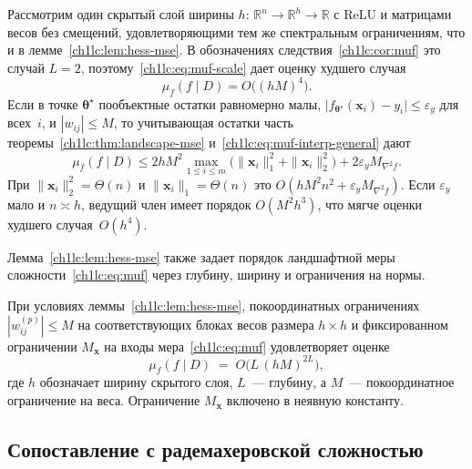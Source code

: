\begin{corollary}\label{ch1lc:cor:shallow}
Рассмотрим один скрытый слой ширины $h$: $\mathbb{R}^{n}\to\mathbb{R}^{h}\to\mathbb{R}$ с ReLU и матрицами весов без смещений, удовлетворяющими тем же спектральным ограничениям, что и в лемме~\ref{ch1lc:lem:hess-mse}.
В обозначениях следствия~\ref{ch1lc:cor:muf} это случай $L=2$, поэтому~\eqref{ch1lc:eq:muf-scale} дает оценку худшего случая
\begin{equation}\label{ch1lc:eq:muf-shallow-worst}
  \mu_f(f\mid D)=O\!\bigl((hM)^{4}\bigr).
\end{equation}
Если в точке $\boldsymbol{\theta}^\star$ пообъектные остатки равномерно малы,
$\bigl|f_{\boldsymbol{\theta}^\star}(\mathbf{x}_i)-y_i\bigr|\le\varepsilon_y$ для всех~$i$, и $|w_{ij}|\le M$, то учитывающая остатки часть теоремы~\ref{ch1lc:thm:landscape-mse} и~\eqref{ch1lc:eq:muf-interp-general} дают
\[
  \mu_f(f\mid D)
  \le
  2hM^{2}\max_{1\le i\le m}\bigl(\|\mathbf{x}_i\|_{1}^{2}+\|\mathbf{x}_i\|_{2}^{2}\bigr)
  +
  2\varepsilon_y M_{\nabla^2 f}.
\]
При $\|\mathbf{x}_i\|_{2}^{2}=\Theta(n)$ и $\|\mathbf{x}_i\|_{1}=\Theta(n)$ это $O(hM^{2}n^{2}+\varepsilon_y M_{\nabla^2 f})$. Если $\varepsilon_y$ мало и $n\asymp h$, ведущий член имеет порядок $O(M^{2}h^{3})$, что мягче оценки худшего случая~$O(h^{4})$.
\end{corollary}

\noindent
Лемма~\ref{ch1lc:lem:hess-mse} также задает порядок ландшафтной меры сложности~\eqref{ch1lc:eq:muf} через глубину, ширину и ограничения на нормы.

\begin{corollary}\label{ch1lc:cor:muf}
При условиях леммы~\ref{ch1lc:lem:hess-mse}, покоординатных ограничениях $|w_{ij}^{(p)}|\le M$ на соответствующих блоках весов размера $h\times h$ и фиксированном ограничении $M_{\mathbf{x}}$ на входы мера~\eqref{ch1lc:eq:muf} удовлетворяет оценке
\begin{equation}\label{ch1lc:eq:muf-scale}
  \mu_f(f\mid D) \;=\; O\!\bigl(L\,(hM)^{2L}\bigr),
\end{equation}
где $h$ обозначает ширину скрытого слоя, $L$~--- глубину, а $M$~--- покоординатное ограничение на веса. Ограничение $M_{\mathbf{x}}$ включено в неявную константу.
\end{corollary}

\subsection{Сопоставление с радемахеровской сложностью}\label{ch1lc:sec:compare}

